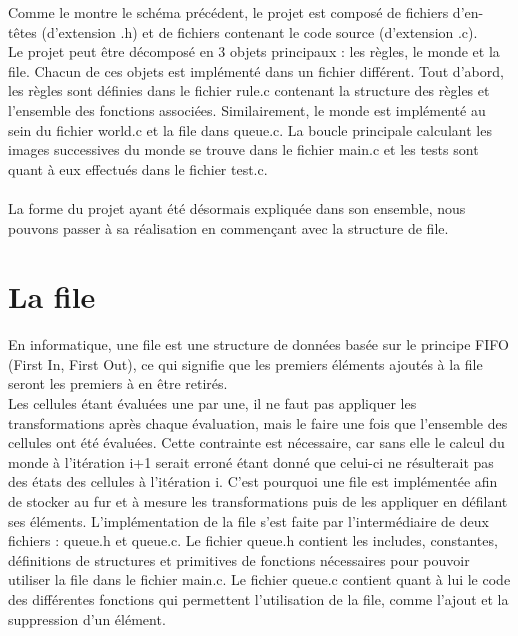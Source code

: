 \documentclass[a4paper]{article}
\begin{document}
Comme le montre le schéma précédent, le projet est composé de fichiers d'en-têtes (d'extension .h) et de fichiers contenant le code source (d'extension .c).\\
Le projet peut être décomposé en 3 objets principaux : les règles, le monde et la file.
Chacun de ces objets est implémenté dans un fichier différent. Tout d'abord, les règles sont définies dans le fichier rule.c contenant la structure des règles et l'ensemble des fonctions associées. Similairement, le monde est implémenté au sein du fichier world.c et la file dans queue.c. La boucle principale calculant les images successives du monde se trouve dans le fichier main.c et les tests sont quant à eux effectués dans le fichier test.c.\\
\\
\indent La forme du projet ayant été désormais expliquée dans son ensemble, nous pouvons passer  à sa réalisation en commençant avec la structure de file.

\newpage

\section{La file}\label{sec:file}
En informatique, une file est une structure de données basée sur le principe FIFO (First In, First Out), ce qui signifie que les premiers éléments ajoutés à la file seront les premiers à en être retirés.\\ 
\indent Les cellules étant évaluées une par une, il ne faut pas appliquer les transformations après chaque évaluation, mais le faire une fois que l'ensemble des cellules ont été évaluées. Cette contrainte est nécessaire, car sans elle le calcul du monde à l'itération i+1 serait erroné étant donné que celui-ci ne résulterait pas des états des cellules à l'itération i. C'est pourquoi une file est implémentée afin de stocker au fur et à mesure les transformations puis de les appliquer en défilant ses éléments. L'implémentation de la file s'est faite par l'intermédiaire de deux fichiers : queue.h et queue.c. Le fichier queue.h contient les includes, constantes, définitions de structures et primitives de fonctions nécessaires pour pouvoir utiliser la file dans le fichier main.c. Le fichier queue.c contient quant à lui le code des différentes fonctions qui permettent l'utilisation de la file, comme l'ajout et la suppression d'un élément.
\end{document}
